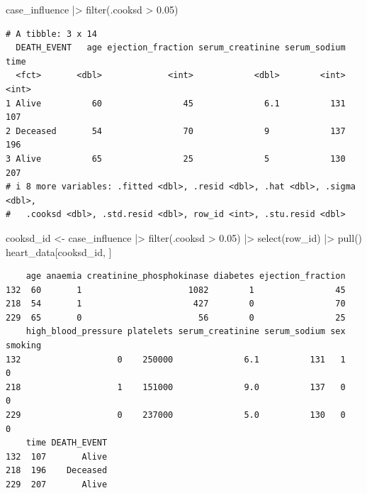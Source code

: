 \documentclass[
  letterpaper,
  DIV=11,
  numbers=noendperiod]{scrartcl}
\newenvironment{Shaded}{\begin{snugshade}}{\end{snugshade}}
\newcommand{\FloatTok}[1]{\textcolor[rgb]{0.68,0.00,0.00}{#1}}
\newcommand{\FunctionTok}[1]{\textcolor[rgb]{0.28,0.35,0.67}{#1}}
\newcommand{\NormalTok}[1]{\textcolor[rgb]{0.00,0.23,0.31}{#1}}
\newcommand{\OtherTok}[1]{\textcolor[rgb]{0.00,0.23,0.31}{#1}}
\newcommand{\SpecialCharTok}[1]{\textcolor[rgb]{0.37,0.37,0.37}{#1}}
\begin{document}
\begin{Shaded}
\begin{Highlighting}[]
\NormalTok{case\_influence }\SpecialCharTok{|\textgreater{}} \FunctionTok{filter}\NormalTok{(.cooksd }\SpecialCharTok{\textgreater{}} \FloatTok{0.05}\NormalTok{)}
\end{Highlighting}
\end{Shaded}

\begin{verbatim}
# A tibble: 3 x 14
  DEATH_EVENT   age ejection_fraction serum_creatinine serum_sodium  time
  <fct>       <dbl>             <int>            <dbl>        <int> <int>
1 Alive          60                45              6.1          131   107
2 Deceased       54                70              9            137   196
3 Alive          65                25              5            130   207
# i 8 more variables: .fitted <dbl>, .resid <dbl>, .hat <dbl>, .sigma <dbl>,
#   .cooksd <dbl>, .std.resid <dbl>, row_id <int>, .stu.resid <dbl>
\end{verbatim}

\begin{Shaded}
\begin{Highlighting}[]
\NormalTok{cooksd\_id }\OtherTok{\textless{}{-}}\NormalTok{ case\_influence }\SpecialCharTok{|\textgreater{}} \FunctionTok{filter}\NormalTok{(.cooksd }\SpecialCharTok{\textgreater{}} \FloatTok{0.05}\NormalTok{) }\SpecialCharTok{|\textgreater{}} \FunctionTok{select}\NormalTok{(row\_id) }\SpecialCharTok{|\textgreater{}} \FunctionTok{pull}\NormalTok{()}
\NormalTok{heart\_data[cooksd\_id, ]}
\end{Highlighting}
\end{Shaded}

\begin{verbatim}
    age anaemia creatinine_phosphokinase diabetes ejection_fraction
132  60       1                     1082        1                45
218  54       1                      427        0                70
229  65       0                       56        0                25
    high_blood_pressure platelets serum_creatinine serum_sodium sex smoking
132                   0    250000              6.1          131   1       0
218                   1    151000              9.0          137   0       0
229                   0    237000              5.0          130   0       0
    time DEATH_EVENT
132  107       Alive
218  196    Deceased
229  207       Alive
\end{verbatim}
\end{document}
